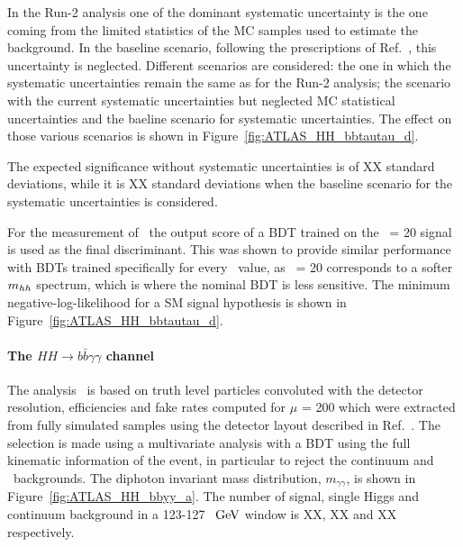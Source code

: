 In the Run-2 analysis one of the dominant systematic uncertainty is the one coming from the limited statistics of the MC samples used to estimate the background. In the baseline scenario, following the prescriptions of Ref.~\cite{ATLASperformance}, this uncertainty is neglected.
Different scenarios are considered: the one in which the systematic uncertainties remain the same as for the Run-2 analysis; the scenario with the current systematic uncertainties but neglected MC statistical uncertainties and the baeline scenario for systematic uncertainties. The effect on those various scenarios is shown in Figure~\ref{fig:ATLAS_HH_bbtautau_d}.

The expected significance without systematic uncertainties is of XX standard deviations, while it is XX standard deviations when the baseline scenario for the systematic uncertainties is considered.

For the measurement of \kl\ the output score of a BDT trained on the \kl\ = 20 signal is used as the final discriminant. This was shown to provide similar performance with BDTs trained specifically for every \kl\ value, as \kl\ = 20 corresponds to a softer $m_{hh}$ spectrum, which is where the nominal BDT is less sensitive.
The minimum negative-log-likelihood for a SM signal hypothesis is shown in Figure~\ref{fig:ATLAS_HH_bbtautau_d}.




%
\paragraph{The $HH \rightarrow b\bar{b}\gamma\gamma$ channel}


The analysis~\cite{ATLASHHPUBnote} is based on truth level particles convoluted with the detector resolution, efficiencies and fake rates computed for $\mu$ = 200 which were extracted from fully simulated samples using the detector layout described in Ref.~\cite{ITKPixelTDR}. The selection is made using a multivariate analysis with a BDT using the full kinematic information of the event, in particular to reject the continuum and \ttH\ backgrounds. 
The diphoton invariant mass distribution, $\ensuremath{m_{\gamma\gamma}}$, is shown in Figure~\ref{fig:ATLAS_HH_bbyy_a}. The number of signal, single Higgs and continuum background in a 123-127~$~\text{GeV}$ window is XX, XX and XX respectively.


